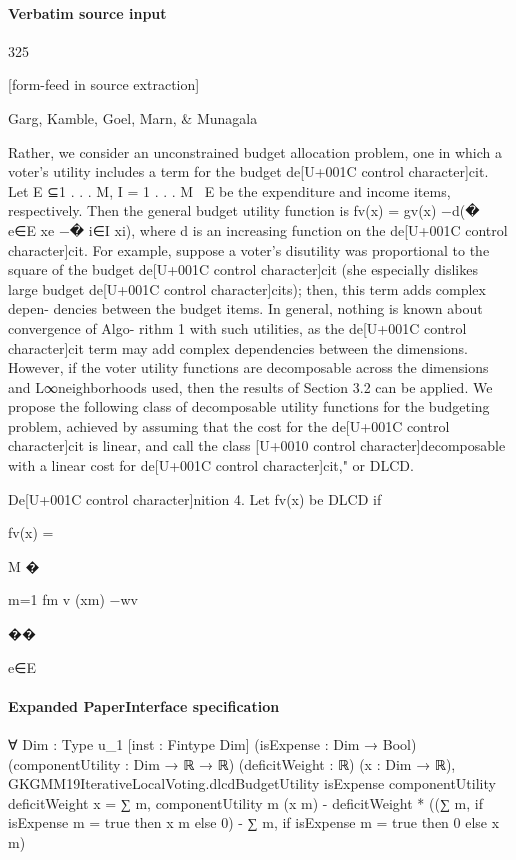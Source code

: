 \documentclass[10pt]{article}
\begin{document}
\paragraph{Verbatim source input}
\begin{ReviewVerbatim}
325


[form-feed in source extraction]

Garg, Kamble, Goel, Marn, & Munagala

Rather, we consider an unconstrained budget allocation problem, one in which a voter's
utility includes a term for the budget de[U+001C control character]cit. Let E ⊆{1 . . . M}, I = {1 . . . M} \ E be
the expenditure and income items, respectively. Then the general budget utility function is
fv(x) = gv(x) −d(�
e∈E xe −�
i∈I xi), where d is an increasing function on the de[U+001C control character]cit.
For example, suppose a voter's disutility was proportional to the square of the budget
de[U+001C control character]cit (she especially dislikes large budget de[U+001C control character]cits); then, this term adds complex depen-
dencies between the budget items. In general, nothing is known about convergence of Algo-
rithm 1 with such utilities, as the de[U+001C control character]cit term may add complex dependencies between the
dimensions. However, if the voter utility functions are decomposable across the dimensions
and L∞neighborhoods used, then the results of Section 3.2 can be applied. We propose
the following class of decomposable utility functions for the budgeting problem, achieved
by assuming that the cost for the de[U+001C control character]cit is linear, and call the class [U+0010 control character]decomposable with a
linear cost for de[U+001C control character]cit," or DLCD.

De[U+001C control character]nition 4. Let fv(x) be DLCD if

fv(x) =

M
�

m=1
fm
v (xm) −wv

��

e∈E
\end{ReviewVerbatim}


\paragraph{Expanded PaperInterface specification}
\begin{ReviewVerbatim}
∀ {Dim : Type u_1} [inst : Fintype Dim] (isExpense : Dim → Bool) (componentUtility : Dim → ℝ → ℝ) (deficitWeight : ℝ)
  (x : Dim → ℝ),
  GKGMM19IterativeLocalVoting.dlcdBudgetUtility isExpense componentUtility deficitWeight x =
    ∑ m, componentUtility m (x m) -
      deficitWeight * ((∑ m, if isExpense m = true then x m else 0) - ∑ m, if isExpense m = true then 0 else x m)
\end{ReviewVerbatim}
\end{document}
